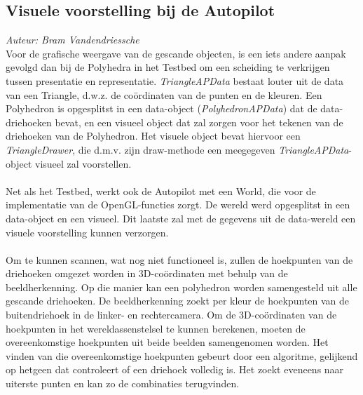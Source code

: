 \subsection{Visuele voorstelling bij de Autopilot}
{\em Auteur: Bram Vandendriessche}\\

\noindent
Voor de grafische weergave van de gescande objecten, is een iets andere aanpak gevolgd dan bij de Polyhedra in het Testbed om een scheiding te verkrijgen tussen presentatie en representatie. \textit{TriangleAPData} bestaat louter uit de data van een Triangle, d.w.z. de co\"ordinaten van de punten en de kleuren. Een Polyhedron is opgesplitst in een data-object (\textit{PolyhedronAPData}) dat de data-driehoeken bevat, en een visueel object dat zal zorgen voor het tekenen van de driehoeken van de Polyhedron. Het visuele object bevat hiervoor een \textit{TriangleDrawer}, die d.m.v. zijn draw-methode een meegegeven \textit{TriangleAPData}-object visueel zal voorstellen.\\
~\\
\noindent
Net als het Testbed, werkt ook de Autopilot met een World, die voor de implementatie van de OpenGL-functies zorgt. De wereld werd opgesplitst in een data-object en een visueel. Dit laatste zal met de gegevens uit de data-wereld een visuele voorstelling kunnen verzorgen.\\
~\\
\noindent
Om te kunnen scannen, wat nog niet functioneel is, zullen de hoekpunten van de driehoeken omgezet worden in 3D-co\"ordinaten met behulp van de beeldherkenning. Op die manier kan een polyhedron worden samengesteld uit alle gescande driehoeken. De beeldherkenning zoekt per kleur de hoekpunten van de buitendriehoek in de linker- en rechtercamera. Om de 3D-co\"ordinaten van de hoekpunten in het wereldassenstelsel te kunnen berekenen, moeten de overeenkomstige hoekpunten uit beide beelden samengenomen worden. Het vinden van die overeenkomstige hoekpunten gebeurt door een algoritme, gelijkend op hetgeen dat controleert of een driehoek volledig is. Het zoekt eveneens naar uiterste punten en kan zo de combinaties terugvinden.  
